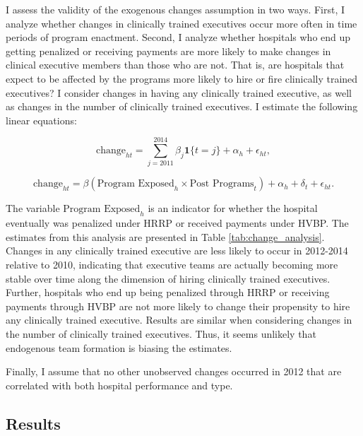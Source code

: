\documentclass[12pt]{article}
\begin{document}
     I assess the validity of the exogenous changes assumption in two ways. First, I analyze whether changes in clinically trained executives occur more often in time periods of program enactment. Second, I analyze whether hospitals who end up getting penalized or receiving payments are more likely to make changes in clinical executive members than those who are not. That is, are hospitals that expect to be affected by the programs more likely to hire or fire clinically trained executives? I consider changes in having any clinically trained executive, as well as changes in the number of clinically trained executives. I estimate the following linear equations:

    \begin{equation}\label{eq:change1}
    \text{change}_{ht} = \sum_{j=2011}^{2014}\beta_j\mathbf{1}\{t=j\} + \alpha_h + \epsilon_{ht},
    \end{equation}

    \begin{equation}\label{eq:change2}
    \text{change}_{ht} = \beta(\text{Program Exposed}_{h} \times \text{Post Programs}_t)+ \alpha_h + \delta_t + \epsilon_{ht}.
    \end{equation}

    The variable $\text{Program Exposed}_{h}$ is an indicator for whether the hospital eventually was penalized under HRRP or received payments under HVBP. The estimates from this analysis are presented in Table \ref{tab:change_analysis}. Changes in any clinically trained executive are less likely to occur in 2012-2014 relative to 2010, indicating that executive teams are actually becoming more stable over time along the dimension of hiring clinically trained executives. Further, hospitals who end up being penalized through HRRP or receiving payments through HVBP are not more likely to change their propensity to hire any clinically trained executive. Results are similar when considering changes in the number of clinically trained executives. Thus, it seems unlikely that endogenous team formation is biasing the estimates.


    Finally, I assume that no other unobserved changes occurred in 2012 that are correlated with both hospital performance and type. 

    
    
    \subsection{Results}
\end{document}
